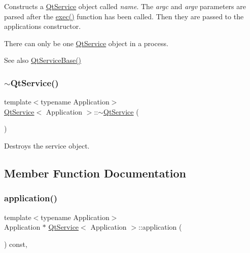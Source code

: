 Constructs a \hyperlink{class_qt_service}{Qt\+Service} object called {\itshape name}. The {\itshape argc} and {\itshape argv} parameters are parsed after the \hyperlink{class_qt_service_base_afae2e589de71c1ae3ae8db3dc9ab9c64}{exec()} function has been called. Then they are passed to the application\textquotesingle{}s constructor.

There can only be one \hyperlink{class_qt_service}{Qt\+Service} object in a process.

\begin{DoxySeeAlso}{See also}
\hyperlink{class_qt_service_base_a75e3f82739df6dc0b9aa899b3f9552eb}{Qt\+Service\+Base()} 
\end{DoxySeeAlso}
\mbox{\label{class_qt_service_a96af408261dfa13bd8034f67949d6c2d}} 
\subsubsection{\texorpdfstring{$\sim$\+Qt\+Service()}{~QtService()}}
{\footnotesize\ttfamily template$<$typename Application$>$ \\
\hyperlink{class_qt_service}{Qt\+Service}$<$ Application $>$\+::$\sim$\hyperlink{class_qt_service}{Qt\+Service} (\begin{DoxyParamCaption}{ }\end{DoxyParamCaption})\hspace{0.3cm}{\ttfamily [inline]}}

Destroys the service object. 

\subsection{Member Function Documentation}
\mbox{\label{class_qt_service_a39743415a6ece5c7c6e6b5b01289c00b}} 
\subsubsection{\texorpdfstring{application()}{application()}}
{\footnotesize\ttfamily template$<$typename Application$>$ \\
Application $\ast$ \hyperlink{class_qt_service}{Qt\+Service}$<$ Application $>$\+::application (\begin{DoxyParamCaption}{ }\end{DoxyParamCaption}) const\hspace{0.3cm}{\ttfamily [inline]}, {\ttfamily [protected]}}

